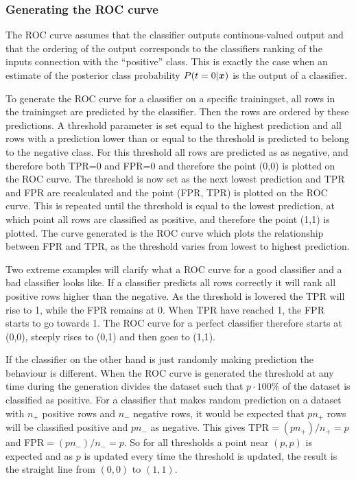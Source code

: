\subsubsection{Generating the ROC curve}
The ROC curve assumes that the classifier outputs continous-valued output and that the ordering of the output corresponds to the classifiers ranking of the inputs connection with the ``positive'' class. This is exactly the case when an estimate of the posterior class probability $P(t=0|\boldsymbol{x})$ is the output of a classifier. \par
To generate the ROC curve for a classifier on a specific trainingset, all rows in the trainingset are predicted by the classifier. Then the rows are ordered by these predictions. A threshold parameter is set equal to the highest prediction and all rows with a prediction lower than or equal to the threshold is predicted to belong to the negative class. For this threshold all rows are predicted as as negative, and therefore both TPR=0 and FPR=0 and therefore the point (0,0) is plotted on the ROC curve. The threshold is now set as the next lowest prediction and TPR and FPR are recalculated and the point (FPR, TPR) is plotted on the ROC curve. This is repeated until the threshold is equal to the lowest prediction, at which point all rows are classified as positive, and therefore the point (1,1) is plotted. The curve generated is the ROC curve which plots the relationship between FPR and TPR, as the threshold varies from lowest to highest prediction. \par
Two extreme examples will clarify what a ROC curve for a good classifier and a bad classifier looks like. If a classifier predicts all rows correctly it will rank all positive rows higher than the negative. As the threshold is lowered the TPR will rise to 1, while the FPR remains at 0. When TPR have reached 1, the FPR starts to go towards 1. The ROC curve for a perfect classifier therefore starts at (0,0), steeply rises to (0,1) and then goes to (1,1). \par
If the classifier on the other hand is just randomly making prediction the behaviour is different. When the ROC curve is generated the threshold at any time during the generation divides the dataset such that $p\cdot 100\%$ of the dataset is classified as positive. For a classifier that makes random prediction on a dataset with $n_+$ positive rows and $n_-$ negative rows, it would be expected that $pn_+$ rows will be classified positive and $pn_-$ as negative. This gives TPR$=(pn_+)/n_+=p$ and FPR$=(pn_-)/n_-=p$. So for all thresholds a point near $(p,p)$ is expected and as $p$ is updated every time the threshold is updated, the result is the straight line from $(0,0)$ to $(1,1)$. \par

